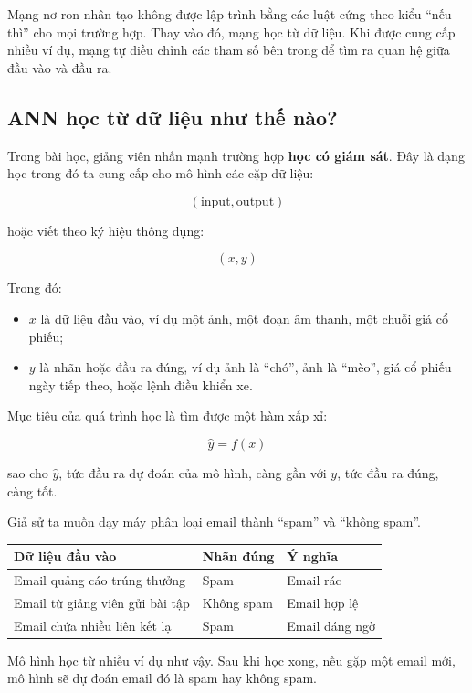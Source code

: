 \begin{ghinho}
Mạng nơ-ron nhân tạo không được lập trình bằng các luật cứng theo kiểu ``nếu--thì'' cho mọi trường hợp. Thay vào đó, mạng học từ dữ liệu. Khi được cung cấp nhiều ví dụ, mạng tự điều chỉnh các tham số bên trong để tìm ra quan hệ giữa đầu vào và đầu ra.
\end{ghinho}

\subsection{ANN học từ dữ liệu như thế nào?}

Trong bài học, giảng viên nhấn mạnh trường hợp \textbf{học có giám sát}. Đây là dạng học trong đó ta cung cấp cho mô hình các cặp dữ liệu:

\[
    (\text{input}, \text{output})
\]

hoặc viết theo ký hiệu thông dụng:

\[
    (x, y)
\]

Trong đó:

\begin{itemize}
    \item $x$ là dữ liệu đầu vào, ví dụ một ảnh, một đoạn âm thanh, một chuỗi giá cổ phiếu;
    \item $y$ là nhãn hoặc đầu ra đúng, ví dụ ảnh là ``chó'', ảnh là ``mèo'', giá cổ phiếu ngày tiếp theo, hoặc lệnh điều khiển xe.
\end{itemize}

Mục tiêu của quá trình học là tìm được một hàm xấp xỉ:

\[
    \hat{y} = f(x)
\]

sao cho $\hat{y}$, tức đầu ra dự đoán của mô hình, càng gần với $y$, tức đầu ra đúng, càng tốt.

\begin{vidu}
Giả sử ta muốn dạy máy phân loại email thành ``spam'' và ``không spam''.

\begin{center}
\begin{tabular}{lll}
\toprule
Dữ liệu đầu vào & Nhãn đúng & Ý nghĩa \\
\midrule
Email quảng cáo trúng thưởng & Spam & Email rác \\
Email từ giảng viên gửi bài tập & Không spam & Email hợp lệ \\
Email chứa nhiều liên kết lạ & Spam & Email đáng ngờ \\
\bottomrule
\end{tabular}
\end{center}

Mô hình học từ nhiều ví dụ như vậy. Sau khi học xong, nếu gặp một email mới, mô hình sẽ dự đoán email đó là spam hay không spam.
\end{vidu}

